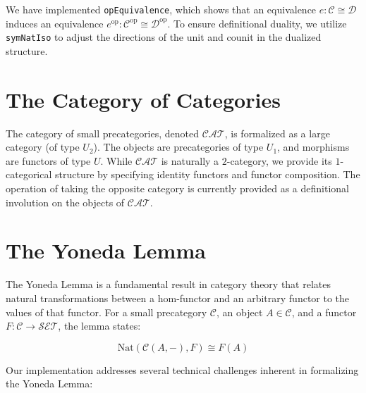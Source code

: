 \documentclass[11pt]{article}
\newcommand{\catC}{\mathcal{C}}
\newcommand{\catD}{\mathcal{D}}
\newcommand{\op}{^\text{op}}
\begin{document}
We have implemented \texttt{opEquivalence}, which shows that an equivalence $e : \catC \cong \catD$ induces
an equivalence $e\op : \catC\op \cong \catD\op$. To ensure definitional duality, we utilize \texttt{symNatIso}
to adjust the directions of the unit and counit in the dualized structure.

\section{The Category of Categories}

The category of small precategories, denoted $\mathcal{CAT}$, is formalized as a large category (of type $U_2$).
The objects are precategories of type $U_1$, and morphisms are functors of type $U$. While $\mathcal{CAT}$ is
naturally a $2$-category, we provide its $1$-categorical structure by specifying identity functors and functor
composition. The operation of taking the opposite category is currently provided as a definitional involution
on the objects of $\mathcal{CAT}$.

\section{The Yoneda Lemma}

The Yoneda Lemma is a fundamental result in category theory that relates natural transformations between a
hom-functor and an arbitrary functor to the values of that functor. For a small precategory $\catC$, an
object $A \in \catC$, and a functor $F : \catC \to \mathcal{SET}$, the lemma states:

\begin{equation}
    \text{Nat}(\catC(A, -), F) \cong F(A)
\end{equation}

Our implementation addresses several technical challenges inherent in formalizing the Yoneda Lemma:
\end{document}
